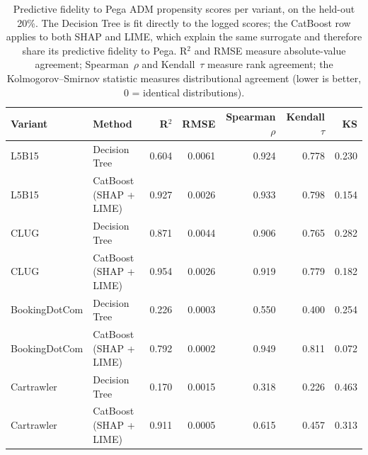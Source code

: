 \begin{table}
\caption{Predictive fidelity to Pega ADM propensity scores per variant, on the held-out 20\%. The Decision Tree is fit directly to the logged scores; the CatBoost row applies to both SHAP and LIME, which explain the same surrogate and therefore share its predictive fidelity to Pega. R$^2$ and RMSE measure absolute-value agreement; Spearman~$\rho$ and Kendall~$\tau$ measure rank agreement; the Kolmogorov--Smirnov statistic measures distributional agreement (lower is better, 0 = identical distributions).}
\label{tab:rq1_explainer_fidelity}
\begin{tabular}{llrrrrr}
\toprule
Variant & Method & R$^2$ & RMSE & Spearman $\rho$ & Kendall $\tau$ & KS \\
\midrule
L5B15 & Decision Tree & 0.604 & 0.0061 & 0.924 & 0.778 & 0.230 \\
L5B15 & CatBoost (SHAP + LIME) & 0.927 & 0.0026 & 0.933 & 0.798 & 0.154 \\
CLUG & Decision Tree & 0.871 & 0.0044 & 0.906 & 0.765 & 0.282 \\
CLUG & CatBoost (SHAP + LIME) & 0.954 & 0.0026 & 0.919 & 0.779 & 0.182 \\
BookingDotCom & Decision Tree & 0.226 & 0.0003 & 0.550 & 0.400 & 0.254 \\
BookingDotCom & CatBoost (SHAP + LIME) & 0.792 & 0.0002 & 0.949 & 0.811 & 0.072 \\
Cartrawler & Decision Tree & 0.170 & 0.0015 & 0.318 & 0.226 & 0.463 \\
Cartrawler & CatBoost (SHAP + LIME) & 0.911 & 0.0005 & 0.615 & 0.457 & 0.313 \\
\bottomrule
\end{tabular}
\end{table}

